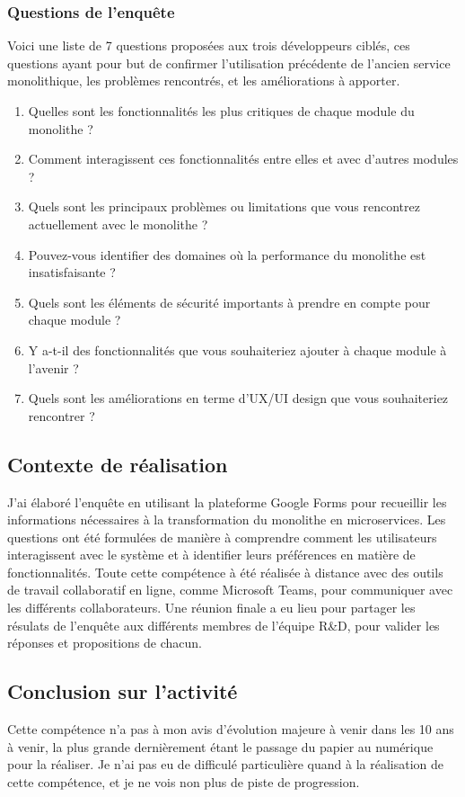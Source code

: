 \documentclass[a4paper, 11pt]{report}
\begin{document}
\subsubsection{Questions de l'enquête}
Voici une liste de 7 questions proposées aux trois développeurs ciblés, ces questions ayant pour but de confirmer l'utilisation précédente de l'ancien service monolithique, les problèmes rencontrés, et les améliorations à apporter.
\begin{enumerate}
\item Quelles sont les fonctionnalités les plus critiques de chaque module du monolithe ?
\item Comment interagissent ces fonctionnalités entre elles et avec d'autres modules ?
\item Quels sont les principaux problèmes ou limitations que vous rencontrez actuellement avec le monolithe ?
\item Pouvez-vous identifier des domaines où la performance du monolithe est insatisfaisante ?
\item Quels sont les éléments de sécurité importants à prendre en compte pour chaque module ?
\item Y a-t-il des fonctionnalités que vous souhaiteriez ajouter à chaque module à l'avenir ?
\item Quels sont les améliorations en terme d'UX/UI design que vous souhaiteriez rencontrer ?
\end{enumerate}
\subsection{Contexte de réalisation}
J'ai élaboré l'enquête en utilisant la plateforme Google Forms pour recueillir les informations nécessaires à la transformation du monolithe en microservices.
Les questions ont été formulées de manière à comprendre comment les utilisateurs interagissent avec le système et à identifier leurs préférences en matière de fonctionnalités.
Toute cette compétence à été réalisée à distance avec des outils de travail collaboratif en ligne, comme Microsoft Teams, pour communiquer avec les différents collaborateurs.
Une réunion finale a eu lieu pour partager les résulats de l'enquête aux différents membres de l'équipe R\&D, pour valider les réponses et propositions de chacun.
\subsection{Conclusion sur l'activité}
Cette compétence n'a pas à mon avis d'évolution majeure à venir dans les 10 ans à venir, la plus grande dernièrement étant le passage du papier au numérique pour la réaliser.
\newline
\newline
Je n'ai pas eu de difficulé particulière quand à la réalisation de cette compétence, et je ne vois non plus de piste de progression.
\end{document}
